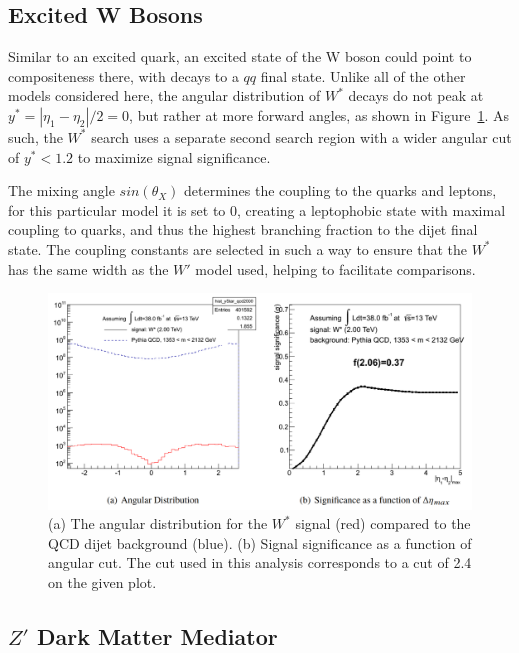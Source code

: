 \subsection{Excited W Bosons}

Similar to an excited quark, an excited state of the W boson could point to compositeness there, with decays to a $qq$ final state.\cite{WStar}  Unlike all of the other models considered here, the angular distribution of $W^*$ decays do not peak at $y^*=|\eta_1-\eta_2|/2=0$, but rather at more forward angles, as shown in Figure~\ref{fig:WStarSignificance}.  As such, the $W^*$ search uses a separate second search region with a wider angular cut of $y^*<1.2$ to maximize signal significance.\cite{WStarTopology}

The mixing angle $sin(\theta_X)$ determines the coupling to the quarks and leptons, for this particular model it is set to 0, creating a leptophobic state with maximal coupling to quarks, and thus the highest branching fraction to the dijet final state.  The coupling constants are selected in such a way to ensure that the $W^*$ has the same width as the $W'$ model used, helping to facilitate comparisons.   


\begin{figure}[h!]
	\centering
	\includegraphics[width=\columnwidth]{figures/Theory/WStarSignificance.png}
	\caption{(a) The angular distribution for the $W^*$ signal (red) compared to the QCD dijet background (blue).  (b) Signal significance as a function of angular cut.  The cut used in this analysis corresponds to a cut of 2.4 on the given plot.}
	\label{fig:WStarSignificance}
\end{figure}

\subsection{$Z'$ Dark Matter Mediator}


